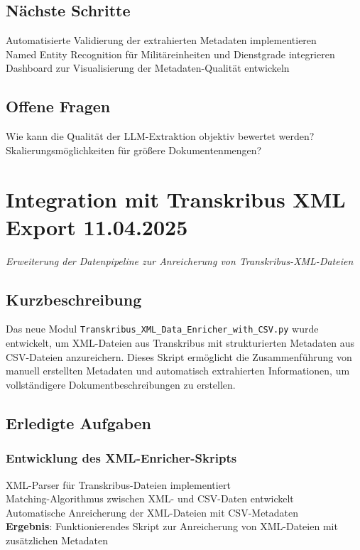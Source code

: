\documentclass{article}
\begin{document}
\subsection*{Nächste Schritte}
 Automatisierte Validierung der extrahierten Metadaten implementieren\\
 Named Entity Recognition für Militäreinheiten und Dienstgrade integrieren\\
 Dashboard zur Visualisierung der Metadaten-Qualität entwickeln

\subsection*{Offene Fragen}
 Wie kann die Qualität der LLM-Extraktion objektiv bewertet werden?\\
 Skalierungsmöglichkeiten für größere Dokumentenmengen?

\section{Integration mit Transkribus XML Export \small 11.04.2025}
\small\textit{Erweiterung der Datenpipeline zur Anreicherung von Transkribus-XML-Dateien}\\
\subsection*{Kurzbeschreibung}

Das neue Modul \texttt{Transkribus\_XML\_Data\_Enricher\_with\_CSV.py} wurde entwickelt, um XML-Dateien aus Transkribus mit strukturierten Metadaten aus CSV-Dateien anzureichern. Dieses Skript ermöglicht die Zusammenführung von manuell erstellten Metadaten und automatisch extrahierten Informationen, um vollständigere Dokumentbeschreibungen zu erstellen.

\subsection*{Erledigte Aufgaben}
\subsubsection*{\small Entwicklung des XML-Enricher-Skripts}
 XML-Parser für Transkribus-Dateien implementiert\\
 Matching-Algorithmus zwischen XML- und CSV-Daten entwickelt\\
 Automatische Anreicherung der XML-Dateien mit CSV-Metadaten\\
\textbf{Ergebnis}: Funktionierendes Skript zur Anreicherung von XML-Dateien mit zusätzlichen Metadaten
\end{document}
